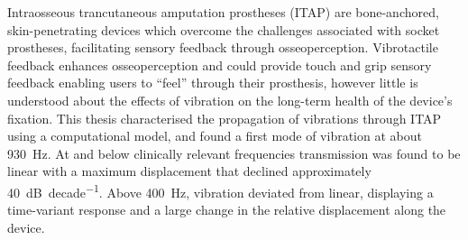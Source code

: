 Intraosseous trancutaneous amputation prostheses (ITAP) are bone-anchored, skin-penetrating devices which overcome the challenges associated with socket prostheses, facilitating sensory feedback through osseoperception.
Vibrotactile feedback enhances osseoperception and could provide touch and grip sensory feedback enabling users to ``feel'' through their prosthesis, however little is understood about the effects of vibration on the long-term health of the device's fixation.
This thesis characterised the propagation of vibrations through ITAP using a computational model, and found a first mode of vibration at about \SI{930}{Hz}.
At and below clinically relevant frequencies transmission was found to be linear with a maximum displacement that declined approximately \SI{40}{\deci\bel\per decade}.
Above \SI{400}{Hz}, vibration deviated from linear, displaying a time-variant response and a large change in the relative displacement along the device.
